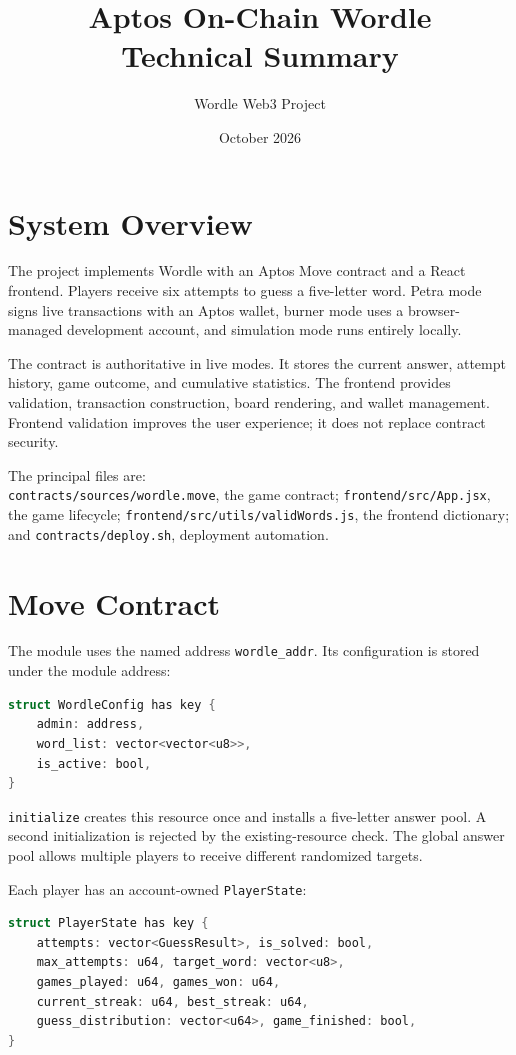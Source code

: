 \documentclass[10pt]{article}
\title{Aptos On-Chain Wordle\\[2mm]\large Technical Summary}
\author{Wordle Web3 Project}
\date{October 2026}
\begin{document}
\maketitle

\section{System Overview}

The project implements Wordle with an Aptos Move contract and a React frontend. Players receive six attempts to guess a five-letter word. Petra mode signs live transactions with an Aptos wallet, burner mode uses a browser-managed development account, and simulation mode runs entirely locally.

The contract is authoritative in live modes. It stores the current answer, attempt history, game outcome, and cumulative statistics. The frontend provides validation, transaction construction, board rendering, and wallet management. Frontend validation improves the user experience; it does not replace contract security.

The principal files are:\\
\texttt{contracts/sources/wordle.move}, the game contract; \texttt{frontend/src/App.jsx}, the game lifecycle; \texttt{frontend/src/utils/validWords.js}, the frontend dictionary; and \texttt{contracts/deploy.sh}, deployment automation.

\section{Move Contract}

The module uses the named address \texttt{wordle\_addr}. Its configuration is stored under the module address:
\begin{lstlisting}[language=C]
struct WordleConfig has key {
    admin: address,
    word_list: vector<vector<u8>>,
    is_active: bool,
}
\end{lstlisting}

\texttt{initialize} creates this resource once and installs a five-letter answer pool. A second initialization is rejected by the existing-resource check. The global answer pool allows multiple players to receive different randomized targets.

Each player has an account-owned \texttt{PlayerState}:
\begin{lstlisting}[language=C]
struct PlayerState has key {
    attempts: vector<GuessResult>, is_solved: bool,
    max_attempts: u64, target_word: vector<u8>,
    games_played: u64, games_won: u64,
    current_streak: u64, best_streak: u64,
    guess_distribution: vector<u64>, game_finished: bool,
}
\end{lstlisting}
\end{document}
